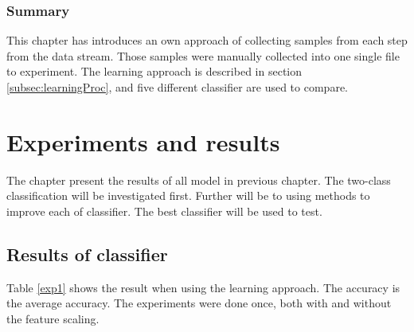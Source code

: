 \documentclass[USenglish]{ifimaster}  %
\begin{document}
\subsection{Summary}
This chapter has introduces an own approach of collecting samples from each step from the data stream. Those samples were manually collected into one single file to experiment. The learning approach is described in section \ref{subsec:learningProc}, and five different classifier are used to compare.
	
\chapter{Experiments and results}                     %
The chapter present the results of all model in previous chapter. The two-class classification will be investigated first. Further will be to using methods to improve each of classifier. The best classifier will be used to test. 
	
\section{Results of classifier}\label{result_exp1}
Table \ref{exp1} shows the result when using the learning approach. The accuracy is the average accuracy. The experiments were done once, both with and without the feature scaling. 
	
\end{document}
